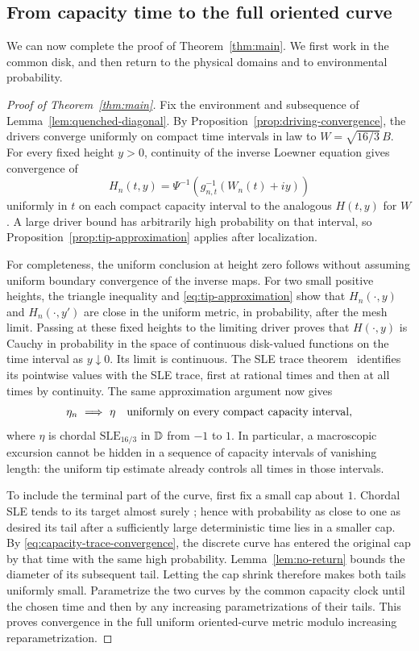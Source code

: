 \subsection{From capacity time to the full oriented curve}

We can now complete the proof of Theorem~\ref{thm:main}.  We first
work in the common disk, and then return to the physical domains
and to environmental probability.

\begin{proof}[Proof of Theorem~\ref{thm:main}]
Fix the environment and subsequence of
Lemma~\ref{lem:quenched-diagonal}.  By
Proposition~\ref{prop:driving-convergence}, the drivers converge
uniformly on compact time intervals in law to
$W=\sqrt{16/3}\,B$.  For every fixed height $y>0$, continuity of
the inverse Loewner equation gives convergence of
\[
 H_n(t,y)=\Psi^{-1}\!\left(g_{n,t}^{-1}(W_n(t)+iy)\right)
\]
uniformly in $t$ on each compact capacity interval to the analogous
$H(t,y)$ for $W$.  A large driver bound has arbitrarily high
probability on that interval, so
Proposition~\ref{prop:tip-approximation} applies after localization.

For completeness, the uniform conclusion at height zero follows
without assuming uniform boundary convergence of the inverse
maps.  For two small positive heights, the triangle inequality
and \eqref{eq:tip-approximation} show that $H_n(\cdot,y)$ and
$H_n(\cdot,y')$ are close in the uniform metric, in probability,
after the mesh limit.  Passing at these fixed heights to the
limiting driver proves that $H(\cdot,y)$ is Cauchy in probability
in the space of continuous disk-valued functions on the time
interval as $y\downarrow0$.  Its limit is continuous.  The SLE
trace theorem~\cite{RS} identifies its pointwise values with the
SLE trace, first at rational times and then at all times by
continuity.  The same approximation argument now gives
\begin{equation}\label{eq:capacity-trace-convergence}
 \eta_n\ \Longrightarrow\ \eta
 \quad\hbox{uniformly on every compact capacity interval},
\end{equation}
where $\eta$ is chordal $\mathrm{SLE}_{16/3}$ in $\mathbb D$ from $-1$
to $1$.  In particular, a macroscopic excursion cannot be hidden
in a sequence of capacity intervals of vanishing length: the
uniform tip estimate already controls all times in those intervals.

To include the terminal part of the curve, first fix a small cap
about $1$.  Chordal SLE tends to its target almost surely
\cite{RS}; hence with probability as close to one as desired its
tail after a sufficiently large deterministic time lies in a
smaller cap.  By \eqref{eq:capacity-trace-convergence}, the
discrete curve has entered the original cap by that time with
the same high probability.  Lemma~\ref{lem:no-return} bounds
the diameter of its subsequent tail.  Letting the cap shrink
therefore makes both tails uniformly small.  Parametrize the
two curves by the common capacity clock until the chosen time
and then by any increasing parametrizations of their tails.
This proves convergence in the full uniform oriented-curve
metric modulo increasing reparametrization.


\end{proof}
